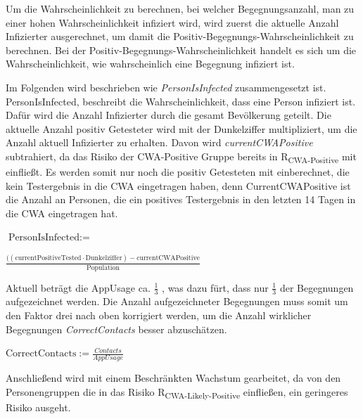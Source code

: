 \documentclass[conference,compsoc]{IEEEtran}
\begin{document}
\centerline{\text{ }}



\text{\}}

\centerline{\text{ }}

Um die Wahrscheinlichkeit zu berechnen, bei welcher Begegnungsanzahl, man zu einer hohen Wahrscheinlichkeit infiziert wird,
wird zuerst die aktuelle Anzahl Infizierter ausgerechnet, um damit die Positiv-Begegnungs-Wahrscheinlichkeit zu berechnen.
Bei der Positiv-Begegnungs-Wahrscheinlichkeit handelt es sich um die Wahrscheinlichkeit, wie wahrscheinlich eine Begegnung infiziert ist.

Im Folgenden wird beschrieben wie \textit{PersonIsInfected} zusammengesetzt ist.
PersonIsInfected, beschreibt die Wahrscheinlichkeit, dass eine Person infiziert ist. Dafür wird die Anzahl Infizierter durch die gesamt Bevölkerung geteilt.
Die aktuelle Anzahl positiv Getesteter wird mit der Dunkelziffer multipliziert, um die Anzahl aktuell Infizierter zu erhalten. 
Davon wird \textit{currentCWAPositive} subtrahiert, da das Risiko der CWA-Positive Gruppe bereits in R\textsubscript{CWA-Positive} mit einfließt. 
Es werden somit nur noch die positiv Getesteten mit einberechnet, die kein Testergebnis in die CWA eingetragen haben, denn
CurrentCWAPositive ist die Anzahl an Personen, die ein positives Testergebnis in den letzten 14 Tagen in die CWA eingetragen hat.

\centerline{\text{ }}
\centerline{$\text{PersonIsInfected} :=$}
\centerline{$\frac{((\text{currentPositiveTested} \cdot \text{Dunkelziffer}) - \text{currentCWAPositive}}{\text{Population}}$}
\centerline{\text{ }}

Aktuell beträgt die AppUsage ca. $\frac{1}{3}$ \cite{Downloads}, was dazu fürt, dass nur $\frac{1}{3}$ der Begegnungen aufgezeichnet werden.
Die Anzahl aufgezeichneter Begegnungen muss somit um den Faktor drei nach oben korrigiert werden, 
um die Anzahl wirklicher Begegnungen \textit{CorrectContacts} besser abzuschätzen. 

\centerline{\text{ }}
\centerline{$\text{CorrectContacts} := \frac{Contacts}{AppUsage}$}
\centerline{\text{ }}

Anschließend wird mit einem Beschränkten Wachstum gearbeitet, da von den Personengruppen die in das Risiko R\textsubscript{CWA-Likely-Positive} einfließen, 
ein geringeres Risiko ausgeht.
\end{document}
